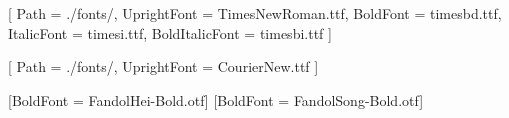 
%
%






\usepackage{fontspec}




\setmainfont{TimesNewRoman.ttf}[
  Path = ./fonts/,
  UprightFont = TimesNewRoman.ttf,
  BoldFont    = timesbd.ttf,
  ItalicFont  = timesi.ttf,
  BoldItalicFont = timesbi.ttf
]

\setmonofont{CourierNew.ttf}[
  Path = ./fonts/,
  UprightFont = CourierNew.ttf
]

[BoldFont = FandolHei-Bold.otf]
[BoldFont = FandolSong-Bold.otf]

\newCJKfontfamily{}

\newCJKfontfamily{}

\newCJKfontfamily{}

\newCJKfontfamily{}

\newcommand{\fs}{\CJKfamily{fs}}     %
\newcommand{\kai}{\CJKfamily{kai}}   %
\newcommand{\hei}{\CJKfamily{hei}}   %
\newcommand{\song}{\CJKfamily{song}} %



